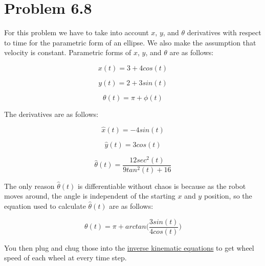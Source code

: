 \documentclass{article}
\begin{document}
\newpage
\section{\textbf{Problem 6.8}}
For this problem we have to take into account $x$, $y$, and $\theta$ derivatives with respect to time for the parametric form of an ellipse. We also make the assumption that velocity is constant. Parametric forms of $x$, $y$, and $\theta$ are as follows:

$$x(t) = 3 + 4cos(t)$$

$$y(t) = 2 + 3sin(t)$$

$$\theta(t) = \pi + \phi(t)$$

The derivatives are as follows:

$$\hat{x}(t) = -4sin(t)$$

$$\hat{y}(t) = 3cos(t)$$

$$\hat{\theta}(t) = \frac{12sec^2(t)}{9tan^2(t) + 16}$$

The only reason $\hat{\theta}(t)$ is differentiable without chaos is because as the robot moves around, the angle is independent of the starting $x$ and $y$ position, so the equation used to calculate $\hat{\theta}(t)$ are as follows:

$$\theta(t) = \pi + arctan\Big(\frac{3sin(t)}{4cos(t)}\Big)$$

You then plug and chug those into the \href{http://roboscience.org/book/html/Motion/DriveSystems.html#equation-meccanuminversekinematics}{inverse kinematic equations} to get wheel speed of each wheel at every time step.
\end{document}
